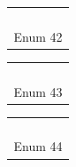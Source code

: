 \begin{flushleft}
\begin{tabular}[t]{|c|c|c|c|c|}
  \hline
  & & & &  \\
  \hline
  & & \cellcolor{blue}& &  \\
  \hline
  & &  \cellcolor{blue}&  &   \\
  \hline
  & \cellcolor{blue}& \cellcolor{blue}& &  \\
  \hline
  & & & &  \\
  \hline
  \multicolumn{5}{c}{Enum 42}\\
\end{tabular}
\hspace{3cm}
\begin{tabular}[t]{|c|c|c|c|c|}
  \hline
  & & & &  \\
  \hline
  & \cellcolor{blue}&  \cellcolor{blue}& &  \\
  \hline
  & \cellcolor{blue}&  & &  \\
  \hline
  & \cellcolor{blue}&  & &  \\
  \hline
  & & & &  \\
  \hline
  \multicolumn{5}{c}{Enum 43}\\
\end{tabular}
\hspace{3cm}
\begin{tabular}[t]{|c|c|c|c|c|}
  \hline
  & & & &  \\
  \hline
  & \cellcolor{blue}& \cellcolor{blue} & &  \\
  \hline
  & & \cellcolor{blue} & &  \\
  \hline
  & &  \cellcolor{blue}& &  \\
  \hline
  & & & &  \\
  \hline
  \multicolumn{5}{c}{Enum 44}\\
\end{tabular}
\end{flushleft}
